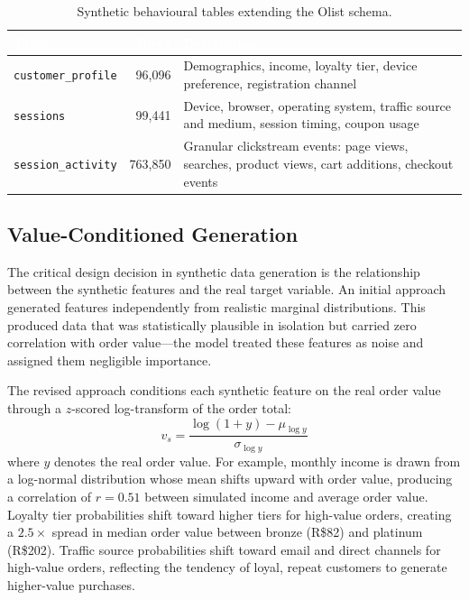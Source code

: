 \documentclass[11pt,a4paper]{article}
\begin{document}
\begin{table}[H]
\centering
\small
{}
\begin{tabularx}{\textwidth}{l r X}
\toprule
\rowcolor{tablehead}
\textcolor{white}{\textbf{Table}} & \textcolor{white}{\textbf{Rows}} & \textcolor{white}{\textbf{Description}} \\
\midrule
\texttt{customer\_profile} & 96{,}096 & Demographics, income, loyalty tier, device preference, registration channel \\
\texttt{sessions}          & 99{,}441 & Device, browser, operating system, traffic source and medium, session timing, coupon usage \\
\texttt{session\_activity} & 763{,}850 & Granular clickstream events: page views, searches, product views, cart additions, checkout events \\
\bottomrule
\end{tabularx}
\caption{Synthetic behavioural tables extending the Olist schema.}
\label{tab:synthetic}
\end{table}

\subsection{Value-Conditioned Generation}
\label{sec:vcg}

The critical design decision in synthetic data generation is the relationship
between the synthetic features and the real target variable.  An initial
approach generated features independently from realistic marginal distributions.
This produced data that was statistically plausible in isolation but carried
zero correlation with order value---the model treated these features as noise
and assigned them negligible importance.

The revised approach conditions each synthetic feature on the real order value
through a $z$-scored log-transform of the order total:
\begin{equation}
  v_s = \frac{\log(1 + y) - \mu_{\log y}}{\sigma_{\log y}}
\end{equation}
where $y$ denotes the real order value.  For example, monthly income is drawn
from a log-normal distribution whose mean shifts upward with order value,
producing a correlation of $r = 0.51$ between simulated income and average
order value.  Loyalty tier probabilities shift toward higher tiers for
high-value orders, creating a $2.5\times$ spread in median order value between
bronze (R\$82) and platinum (R\$202).  Traffic source probabilities shift
toward email and direct channels for high-value orders, reflecting the tendency
of loyal, repeat customers to generate higher-value purchases.
\end{document}
